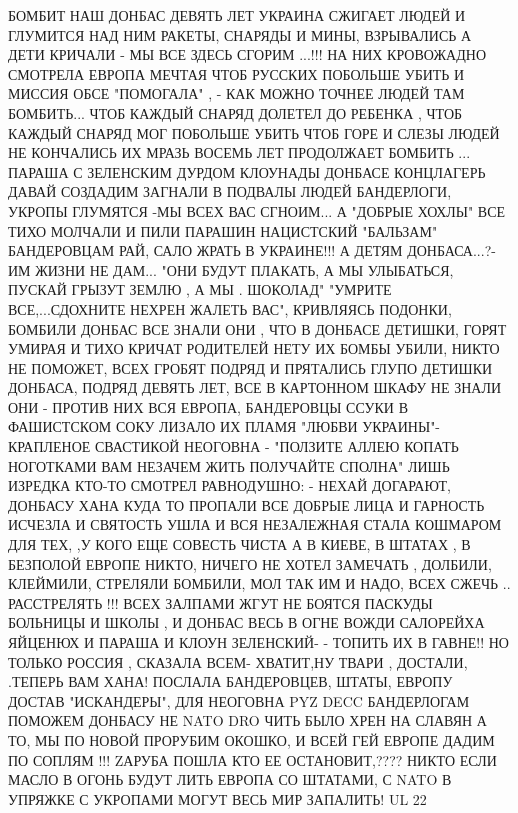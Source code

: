 БОМБИТ НАШ ДОНБАС
ДЕВЯТЬ ЛЕТ УКРАИНА
СЖИГАЕТ ЛЮДЕЙ И ГЛУМИТСЯ НАД НИМ
РАКЕТЫ, СНАРЯДЫ И МИНЫ, ВЗРЫВАЛИСЬ
А ДЕТИ КРИЧАЛИ - МЫ ВСЕ ЗДЕСЬ СГОРИМ ...!!!
НА НИХ КРОВОЖАДНО СМОТРЕЛА ЕВРОПА
МЕЧТАЯ ЧТОБ РУССКИХ ПОБОЛЬШЕ УБИТЬ
И МИССИЯ ОБСЕ "ПОМОГАЛА" ,
- КАК МОЖНО ТОЧНЕЕ ЛЮДЕЙ ТАМ БОМБИТЬ...
ЧТОБ КАЖДЫЙ СНАРЯД ДОЛЕТЕЛ
ДО РЕБЕНКА ,
ЧТОБ КАЖДЫЙ СНАРЯД
МОГ ПОБОЛЬШЕ УБИТЬ
ЧТОБ ГОРЕ И СЛЕЗЫ ЛЮДЕЙ НЕ КОНЧАЛИСЬ
ИХ МРАЗЬ ВОСЕМЬ ЛЕТ
ПРОДОЛЖАЕТ БОМБИТЬ ...
ПАРАША С ЗЕЛЕНСКИМ
ДУРДОМ КЛОУНАДЫ
ДОНБАСЕ КОНЦЛАГЕРЬ
ДАВАЙ СОЗДАДИМ
ЗАГНАЛИ В ПОДВАЛЫ
ЛЮДЕЙ БАНДЕРЛОГИ,
УКРОПЫ ГЛУМЯТСЯ
-МЫ ВСЕХ ВАС СГНОИМ...
А "ДОБРЫЕ ХОХЛЫ"
ВСЕ ТИХО МОЛЧАЛИ
И ПИЛИ ПАРАШИН
НАЦИСТСКИЙ "БАЛЬЗАМ"
БАНДЕРОВЦАМ РАЙ,
САЛО ЖРАТЬ В УКРАИНЕ!!!
А ДЕТЯМ ДОНБАСА...?-
ИМ ЖИЗНИ НЕ ДАМ...
"ОНИ БУДУТ ПЛАКАТЬ,
А МЫ УЛЫБАТЬСЯ,
ПУСКАЙ ГРЫЗУТ ЗЕМЛЮ ,
А МЫ . ШОКОЛАД"
"УМРИТЕ ВСЕ,...СДОХНИТЕ
НЕХРЕН ЖАЛЕТЬ ВАС",
КРИВЛЯЯСЬ ПОДОНКИ,
БОМБИЛИ ДОНБАС
ВСЕ ЗНАЛИ ОНИ ,
ЧТО В ДОНБАСЕ ДЕТИШКИ,
ГОРЯТ УМИРАЯ
И ТИХО КРИЧАТ
РОДИТЕЛЕЙ НЕТУ
ИХ БОМБЫ УБИЛИ,
НИКТО НЕ ПОМОЖЕТ,
ВСЕХ ГРОБЯТ ПОДРЯД
И ПРЯТАЛИСЬ ГЛУПО
ДЕТИШКИ ДОНБАСА,
ПОДРЯД ДЕВЯТЬ ЛЕТ,
ВСЕ В КАРТОННОМ ШКАФУ
НЕ ЗНАЛИ ОНИ -
ПРОТИВ НИХ ВСЯ ЕВРОПА,
БАНДЕРОВЦЫ ССУКИ
В ФАШИСТСКОМ СОКУ
ЛИЗАЛО ИХ ПЛАМЯ "ЛЮБВИ УКРАИНЫ"-
КРАПЛЕНОЕ СВАСТИКОЙ НЕОГОВНА - "ПОЛЗИТЕ АЛЛЕЮ КОПАТЬ НОГОТКАМИ
ВАМ НЕЗАЧЕМ ЖИТЬ ПОЛУЧАЙТЕ СПОЛНА"
ЛИШЬ ИЗРЕДКА КТО-ТО
СМОТРЕЛ РАВНОДУШНО:
- НЕХАЙ ДОГАРАЮТ,
ДОНБАСУ ХАНА
КУДА ТО ПРОПАЛИ
ВСЕ ДОБРЫЕ ЛИЦА
И ГАРНОСТЬ ИСЧЕЗЛА
И СВЯТОСТЬ УШЛА
И ВСЯ НЕЗАЛЕЖНАЯ
СТАЛА КОШМАРОМ
ДЛЯ ТЕХ, ,У КОГО
ЕЩЕ СОВЕСТЬ ЧИСТА
А В КИЕВЕ, В ШТАТАХ , В БЕЗПОЛОЙ ЕВРОПЕ НИКТО, НИЧЕГО
НЕ ХОТЕЛ ЗАМЕЧАТЬ ,
ДОЛБИЛИ, КЛЕЙМИЛИ,
СТРЕЛЯЛИ БОМБИЛИ,
МОЛ ТАК ИМ И НАДО,
ВСЕХ СЖЕЧЬ ..
РАССТРЕЛЯТЬ !!!
ВСЕХ ЗАЛПАМИ ЖГУТ
НЕ БОЯТСЯ ПАСКУДЫ
БОЛЬНИЦЫ И ШКОЛЫ ,
И ДОНБАС ВЕСЬ В ОГНЕ
ВОЖДИ САЛОРЕЙХА
ЯЙЦЕНЮХ И ПАРАША
И КЛОУН ЗЕЛЕНСКИЙ-
- ТОПИТЬ ИХ В ГАВНЕ!!
НО ТОЛЬКО РОССИЯ ,
СКАЗАЛА ВСЕМ-
ХВАТИТ,НУ ТВАРИ ,
ДОСТАЛИ, .ТЕПЕРЬ ВАМ ХАНА!
ПОСЛАЛА БАНДЕРОВЦЕВ,
ШТАТЫ, ЕВРОПУ
ДОСТАВ "ИСКАНДЕРЫ",
ДЛЯ НЕОГОВНА
PYZ DECC БАНДЕРЛОГАМ
ПОМОЖЕМ ДОНБАСУ
НЕ NATO DRO ЧИТЬ БЫЛО
ХРЕН НА СЛАВЯН
А ТО, МЫ ПО НОВОЙ
ПРОРУБИМ ОКОШКО,
И ВСЕЙ ГЕЙ ЕВРОПЕ
ДАДИМ ПО СОПЛЯМ !!!
ZАРУБА ПОШЛА КТО ЕЕ ОСТАНОВИТ,????
НИКТО ЕСЛИ МАСЛО В ОГОНЬ БУДУТ ЛИТЬ
ЕВРОПА СО ШТАТАМИ, С NATO В УПРЯЖКЕ
С УКРОПАМИ МОГУТ ВЕСЬ МИР ЗАПАЛИТЬ!
UL 22

